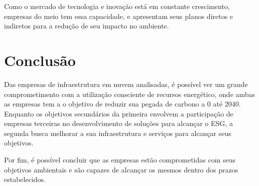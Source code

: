 \documentclass[12pt]{article}
\begin{document}
	Como o mercado de tecnologia e inovação está em constante crescimento, empresas do meio tem essa capacidade, e apresentam seus planos diretos e indiretos para a redução de seu impacto no ambiente.
	
	\section*{Conclusão}
	
	Das empresas de infraestrutura em nuvem analisadas, é possível ver um grande comprometimento com a utilização consciente de recursos energético, onde ambas as empresas tem a o objetivo de reduzir sua pegada de carbono a 0 até 2040. Enquanto os objetivos secundários da primeira envolvem a participação de empresas terceiras no desenvolvimento de soluções para alcançar o ESG, a segunda busca melhorar a sua infraestrutura e serviços para alcançar seus objetivos.
	
	Por fim, é possível concluir que as empresas estão comprometidas com seus objetivos ambientais e são capazes de alcançar os mesmos dentro dos prazos estabelecidos.
	
	
	
\end{document}
